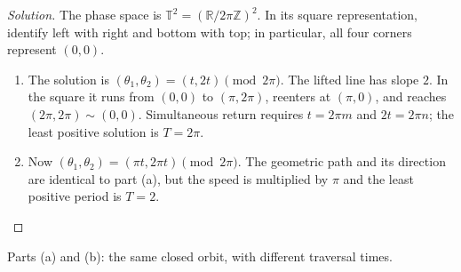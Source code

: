 \documentclass[12pt]{amsart}
\theoremstyle{plain}
\theoremstyle{definition}
\theoremstyle{definition}
\theoremstyle{plain}
\newenvironment{solution}
{\begin{proof}[Solution]}
{\end{proof}}
\begin{document}
    \begin{solution}
    The phase space is $\mathbb T^2=(\mathbb R/2\pi\mathbb Z)^2$.
    In its square representation, identify left with right and bottom with top;
    in particular, all four corners represent $(0,0)$.
    \begin{enumerate}[label=(\alph*)]
    \item The solution is
    $(\theta_1,\theta_2)=(t,2t)\pmod{2\pi}$.
    The lifted line has slope $2$. In the square it runs from
    $(0,0)$ to $(\pi,2\pi)$, reenters at $(\pi,0)$,
    and reaches $(2\pi,2\pi)\sim(0,0)$.
    Simultaneous return requires $t=2\pi m$ and $2t=2\pi n$;
    the least positive solution is $\boxed{T=2\pi}$.
    \item Now $(\theta_1,\theta_2)=(\pi t,2\pi t)\pmod{2\pi}$.
    The geometric path and its direction are identical to part (a),
    but the speed is multiplied by $\pi$ and the least positive period
    is $\boxed{T=2}$.
    \end{enumerate}
    \end{solution}
    \begin{center}
\begin{minipage}{\linewidth}\centering
{}

    {\small Parts (a) and (b): the same closed orbit, with different traversal times.}
    \end{minipage}
\end{center}
\end{document}
